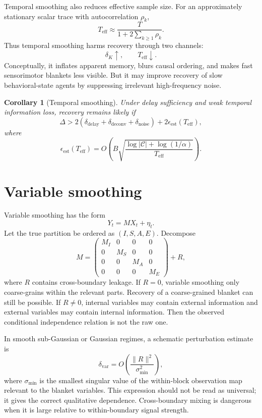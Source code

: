 \documentclass[10pt]{article}
\newtheorem{corollary}{Corollary}
\newcommand{\cC}{\mathcal{C}}
\newcommand{\eff}{\mathrm{eff}}
\begin{document}
Temporal smoothing also reduces effective sample size. For an approximately stationary scalar trace with autocorrelation \(\rho_k\),
\begin{equation}
T_{\eff}
\approx
\frac{T}{1+2\sum_{k\ge 1}\rho_k}.
\label{eq:teff}
\end{equation}
Thus temporal smoothing harms recovery through two channels:
\[
\delta_K\uparrow,
\qquad
T_{\eff}\downarrow.
\]
Conceptually, it inflates apparent memory, blurs causal ordering, and makes fast sensorimotor blankets less visible. But it may improve recovery of slow behavioral-state agents by suppressing irrelevant high-frequency noise.

\begin{corollary}[Temporal smoothing]
Under delay sufficiency and weak temporal information loss, recovery remains likely if
\[
\Delta
>
2(\delta_{\mathrm{delay}}+\delta_{\mathrm{deconv}}+\delta_{\mathrm{noise}})
+
2\epsilon_{\mathrm{est}}(T_{\eff}),
\]
where
\[
\epsilon_{\mathrm{est}}(T_{\eff})
=
O\!\left(
B\sqrt{\frac{\log |\cC|+\log(1/\alpha)}{T_{\eff}}}
\right).
\]
\end{corollary}

\section{Variable smoothing}

Variable smoothing has the form
\begin{equation}
Y_t=M X_t+\eta_t.
\label{eq:variable_smoothing}
\end{equation}
Let the true partition be ordered as \((I,S,A,E)\). Decompose
\[
M
=
\begin{pmatrix}
M_I & 0 & 0 & 0\\
0 & M_S & 0 & 0\\
0 & 0 & M_A & 0\\
0 & 0 & 0 & M_E
\end{pmatrix}
+
R,
\label{eq:block_diag}
\]
where \(R\) contains cross-boundary leakage. If \(R=0\), variable smoothing only coarse-grains within the relevant parts. Recovery of a coarse-grained blanket can still be possible. If \(R\ne0\), internal variables may contain external information and external variables may contain internal information. Then the observed conditional independence relation is not the raw one.

In smooth sub-Gaussian or Gaussian regimes, a schematic perturbation estimate is
\[
\delta_{\mathrm{var}}
=
O\!\left(\frac{\|R\|^2}{\sigma_{\min}^2}\right),
\]
where \(\sigma_{\min}\) is the smallest singular value of the within-block observation map relevant to the blanket variables. This expression should not be read as universal; it gives the correct qualitative dependence. Cross-boundary mixing is dangerous when it is large relative to within-boundary signal strength.
\end{document}
